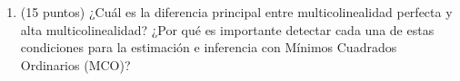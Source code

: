 \documentclass[10pt,a4paper]{article}
\begin{document}
\begin{enumerate}

\item (15 puntos) ¿Cuál es la diferencia principal entre multicolinealidad perfecta y alta multicolinealidad?
¿Por qué es importante detectar cada una de estas condiciones para la estimación e inferencia con Mínimos Cuadrados Ordinarios (MCO)?






\end{enumerate}
\end{document}
